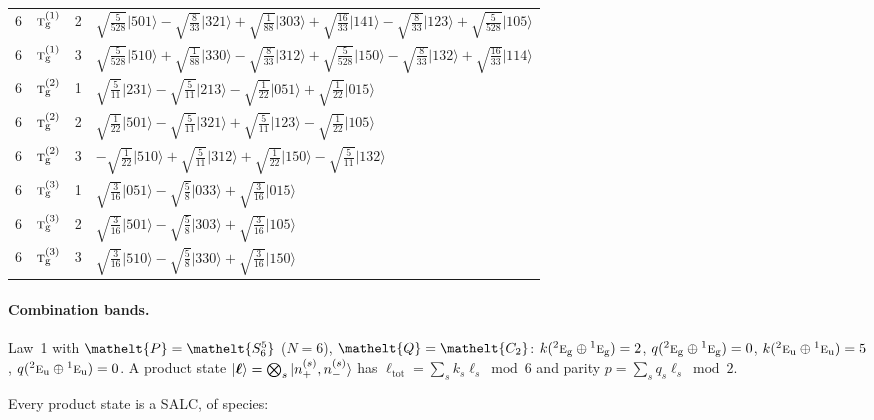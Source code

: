 \documentclass[11pt]{article}
\newcommand{\eltfont}[1]{{\let\sigma\eltsigma\mathelt{#1}}}
\newcommand{\irr}[1]{\text{\normalfont\scshape #1}}
\newcommand{\conjpair}[1]{{}^{#1}}
\newcommand{\elt}[1]{\eltfont{#1}}
\newcommand{\ptag}[1]{\mathrm{#1}}
\newcommand{\occ}[1]{\lvert #1\rangle}
\newcommand{\pel}{\elt{P}}             %
\newcommand{\qel}{\elt{Q}}             %
\begin{document}
\begin{longtable}{c l c p{}}
6 & $\irr{t}_{\ptag{g}}^{(1)}$ & 2 & $\sqrt{\tfrac{5}{528}}\occ{501}-\sqrt{\tfrac{8}{33}}\occ{321}+\sqrt{\tfrac{1}{88}}\occ{303}+\sqrt{\tfrac{16}{33}}\occ{141}-\sqrt{\tfrac{8}{33}}\occ{123}+\sqrt{\tfrac{5}{528}}\occ{105}$\\
6 & $\irr{t}_{\ptag{g}}^{(1)}$ & 3 & $\sqrt{\tfrac{5}{528}}\occ{510}+\sqrt{\tfrac{1}{88}}\occ{330}-\sqrt{\tfrac{8}{33}}\occ{312}+\sqrt{\tfrac{5}{528}}\occ{150}-\sqrt{\tfrac{8}{33}}\occ{132}+\sqrt{\tfrac{16}{33}}\occ{114}$\\
6 & $\irr{t}_{\ptag{g}}^{(2)}$ & 1 & $\sqrt{\tfrac{5}{11}}\occ{231}-\sqrt{\tfrac{5}{11}}\occ{213}-\sqrt{\tfrac{1}{22}}\occ{051}+\sqrt{\tfrac{1}{22}}\occ{015}$\\
6 & $\irr{t}_{\ptag{g}}^{(2)}$ & 2 & $\sqrt{\tfrac{1}{22}}\occ{501}-\sqrt{\tfrac{5}{11}}\occ{321}+\sqrt{\tfrac{5}{11}}\occ{123}-\sqrt{\tfrac{1}{22}}\occ{105}$\\
6 & $\irr{t}_{\ptag{g}}^{(2)}$ & 3 & $-\sqrt{\tfrac{1}{22}}\occ{510}+\sqrt{\tfrac{5}{11}}\occ{312}+\sqrt{\tfrac{1}{22}}\occ{150}-\sqrt{\tfrac{5}{11}}\occ{132}$\\
6 & $\irr{t}_{\ptag{g}}^{(3)}$ & 1 & $\sqrt{\tfrac{3}{16}}\occ{051}-\sqrt{\tfrac{5}{8}}\occ{033}+\sqrt{\tfrac{3}{16}}\occ{015}$\\
6 & $\irr{t}_{\ptag{g}}^{(3)}$ & 2 & $\sqrt{\tfrac{3}{16}}\occ{501}-\sqrt{\tfrac{5}{8}}\occ{303}+\sqrt{\tfrac{3}{16}}\occ{105}$\\
6 & $\irr{t}_{\ptag{g}}^{(3)}$ & 3 & $\sqrt{\tfrac{3}{16}}\occ{510}-\sqrt{\tfrac{5}{8}}\occ{330}+\sqrt{\tfrac{3}{16}}\occ{150}$\\
\hline
\end{longtable}

\paragraph{Combination bands.}

Law~1 with $\pel=\elt{S_{6}^{5}}$ ($N=6$), $\qel=\elt{C_{2}}$: $k(\conjpair{2}\irr{e}_{\ptag{g}}\oplus \conjpair{1}\irr{e}_{\ptag{g}})=2$, $q(\conjpair{2}\irr{e}_{\ptag{g}}\oplus \conjpair{1}\irr{e}_{\ptag{g}})=0$, $k(\conjpair{2}\irr{e}_{\ptag{u}}\oplus \conjpair{1}\irr{e}_{\ptag{u}})=5$, $q(\conjpair{2}\irr{e}_{\ptag{u}}\oplus \conjpair{1}\irr{e}_{\ptag{u}})=0$. A product state $\ket{\boldsymbol\ell}=\bigotimes_s\ket{n_+^{(s)},n_-^{(s)}}$ has $\ell_{\mathrm{tot}}=\sum_sk_s\ell_s\bmod 6$ and parity $p=\sum_sq_s\ell_s\bmod2$.

Every product state is a SALC, of species:
\end{document}
